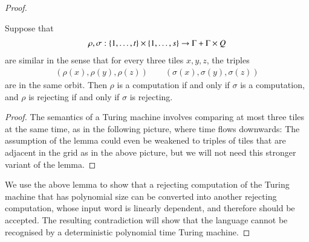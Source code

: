 \begin{proof}
\begin{lemma}\label{lem:turing-three-consistency}
	Suppose that 
	\begin{align*}
		\rho, \sigma : \{1,\ldots,t\} \times \{1,\ldots,s\} \to \Gamma + \Gamma \times Q 
	\end{align*}
	are similar in the sense that for every three tiles $x,y,z$, the triples
\begin{align*}
	(\rho(x), \rho(y), \rho(z)) \qquad ( \sigma(x), \sigma(y), \sigma(z))
\end{align*}
	are in the same orbit. Then $\rho$ is a computation if and only if $\sigma$ is a computation, and $\rho$ is rejecting if and only if $\sigma$ is rejecting. 
\end{lemma}
\begin{proof}
	 The semantics of a Turing machine involves comparing at most three tiles at the same time, as in the following picture, where time flows downwards:
	 The assumption of the lemma could even be weakened to triples of tiles that are adjacent in the grid as in the above picture, but we will not need this stronger variant of the lemma.
\end{proof}

We use the above lemma to show that a rejecting computation of the Turing machine that has polynomial size can be converted into another rejecting computation, whose input word is linearly dependent, and therefore should be accepted. The resulting contradiction will show that the language cannot be recognised by a deterministic polynomial time Turing machine.


\end{proof}
